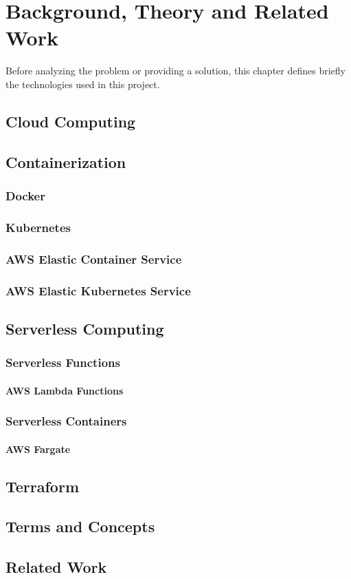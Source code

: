 \part{Background, Theory and Related Work}

Before analyzing the problem or providing a solution,
this chapter defines briefly the technologies used in this project.

\chapter{Cloud Computing}

\chapter{Containerization}
\section{Docker}
\section{Kubernetes}
\section{AWS Elastic Container Service}
\section{AWS Elastic Kubernetes Service}

\chapter{Serverless Computing}
\section{Serverless Functions}
\subsection{AWS Lambda Functions}
\section{Serverless Containers}
\subsection{AWS Fargate}

\chapter{Terraform}

\chapter{Terms and Concepts}

\chapter{Related Work}
